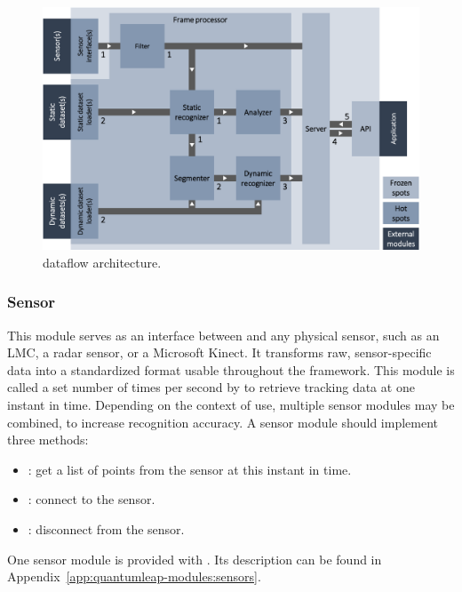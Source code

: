 \begin{figure}[t]
    \centering
    \includegraphics[width=\linewidth]{Figures/QuantumLeap/Architecture/quantumleap.pdf}
    \vspace{-8pt}
    \caption{\ql dataflow architecture.}
    \label{fig:quantumleap:archi}
\end{figure}

\subsubsection{Sensor} 
This module serves as an interface between \ql and any physical sensor, such as an LMC, a radar sensor, or a Microsoft Kinect. It transforms raw, sensor-specific data into a standardized format usable throughout the framework. This module is called a set number of times per second by \ql to retrieve tracking data at one instant in time. Depending on the context of use, multiple sensor modules may be combined, \eg to increase recognition accuracy. A sensor module should implement three methods:
\begin{itemize}[noitemsep]
    \item {}: get a list of points from the sensor at this instant in time.
    \item {}: connect to the sensor.
    \item {}: disconnect from the sensor.
\end{itemize}
One sensor module is provided with \ql. Its description can be found in Appendix~\ref{app:quantumleap-modules:sensors}.

